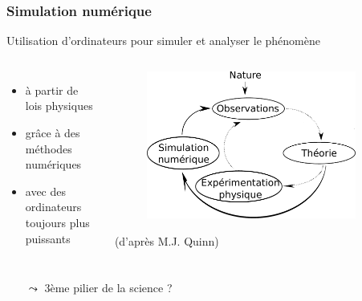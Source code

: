 \documentclass[xcolor={x11names,svgnames}]{beamer}
\begin{document}
\begin{frame}
  \frametitle{Simulation numérique}

  \begin{exampleblock}{Utilisation d'ordinateurs pour simuler et analyser le phénomène}
  
  \begin{columns}[t]
    \begin{itemize}
    \item à partir de lois physiques 

      \medskip

    \item grâce à des méthodes 
      numériques

      \medskip
      
    \item avec des ordinateurs toujours 
      plus puissants
    \end{itemize}
    
    \begin{center}
      \begin{figure}[ht]
        \centering
        \includegraphics[width=0.9\textwidth]{Science-SimuNum.pdf}
      \end{figure}
      {\tiny (d'après 
        M.J. Quinn)} 
    \end{center}
  \end{columns}
\end{exampleblock}

\begin{itemize}
\item[$\leadsto$] 3ème pilier de la science ?
\end{itemize}  
\end{frame}
\end{document}

